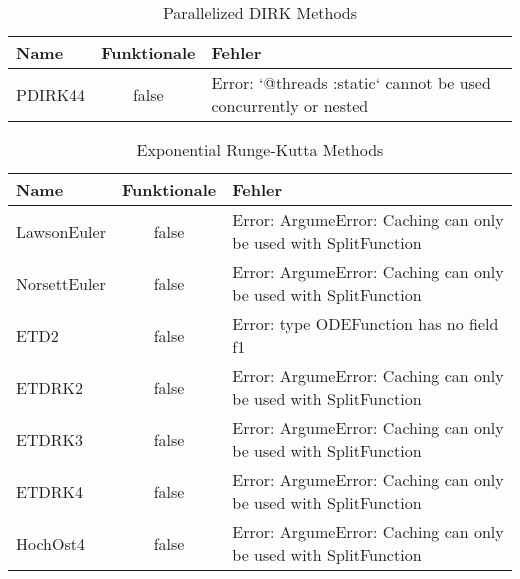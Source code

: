 \begin{table}[]
    \centering

    \begin{tabular}{p{5cm}|c|p{5cm}}
        Name & Funktionale & Fehler \\
        \hline\hline
        PDIRK44 & false & Error: `@threads :static` cannot be used concurrently or nested \\     
    \end{tabular}
    \caption{Parallelized DIRK Methods}
    \label{tab:my_label}
\end{table}

\begin{table}[]
    \centering

    \begin{tabular}{p{5cm}|c|p{5cm}}
        Name & Funktionale & Fehler \\
        \hline\hline
        LawsonEuler  & false & Error: ArgumeError: Caching can only be used with SplitFunction \\
        NorsettEuler & false & Error: ArgumeError: Caching can only be used with SplitFunction \\
        ETD2         & false & Error: type ODEFunction has no field f1 \\
        ETDRK2       & false & Error: ArgumeError: Caching can only be used with SplitFunction \\
        ETDRK3       & false & Error: ArgumeError: Caching can only be used with SplitFunction \\
        ETDRK4       & false & Error: ArgumeError: Caching can only be used with SplitFunction \\
        HochOst4     & false & Error: ArgumeError: Caching can only be used with SplitFunction \\
    \end{tabular}
    \caption{Exponential Runge-Kutta Methods}
    \label{tab:my_label}
\end{table}

